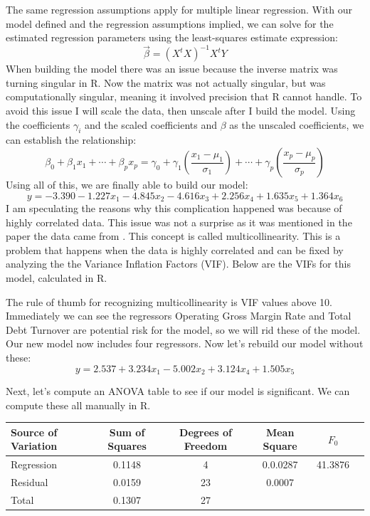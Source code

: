 \documentclass[12pt,letterpaper]{article}
\begin{document}
The same regression assumptions apply for multiple linear regression. With our model defined and the regression assumptions implied, we can solve for the estimated regression parameters using the least-squares estimate expression: $$\vec{\beta}=\left(X^tX\right)^{-1}X^tY$$ When building the model there was an issue because the inverse matrix was turning singular in R. Now the matrix was not actually singular, but was computationally singular, meaning it involved precision that R cannot handle. To avoid this issue I will scale the data, then unscale after I build the model. Using the coefficients $\gamma_i$ and the scaled coefficients and $\beta$ as the unscaled coefficients, we can establish the relationship: $$\beta_0+\beta_1x_1+\cdots+\beta_px_p=\gamma_0+\gamma_1\left(\frac{x_1-\mu_1}{\sigma_1}\right)+\cdots+\gamma_p\left(\frac{x_p-\mu_p}{\sigma_p}\right)$$ Using all of this, we are finally able to build our model: $$y=-3.390-1.227x_1-4.845x_2-4.616x_3+2.256x_4+1.635x_5+1.364x_6$$ I am speculating the reasons why this complication happened was because of highly correlated data. This issue was not a surprise as it was mentioned in the paper the data came from \cite{paper}. This concept is called multicollinearity. This is a problem that happens when the data is highly correlated and can be fixed by analyzing the the Variance Inflation Factors (VIF). Below are the VIFs for this model, calculated in R.

\begin{mdframed}

\end{mdframed}

The rule of thumb for recognizing multicollinearity is VIF values above 10. Immediately we can see the regressors Operating Gross Margin Rate and Total Debt Turnover are potential risk for the model, so we will rid these of the model. Our new model now includes four regressors. Now let's rebuild our model without these: $$y=2.537+3.234x_1-5.002x_2+3.124x_4+1.505x_5$$

Next, let's compute an ANOVA table to see if our model is significant. We can compute these all manually in R.

\begin{center}
\begin{tabular}{lccccc}
	\hline
	Source of Variation & Sum of Squares & Degrees of Freedom & Mean Square & $F_0$\\
	\hline
	Regression & 0.1148 & 4 & 0.0.0287 & 41.3876\\
	Residual & 0.0159 & 23 & 0.0007 &\\
	Total & 0.1307 & 27 & &\\
	\hline
\end{tabular}
\end{center}
\end{document}
